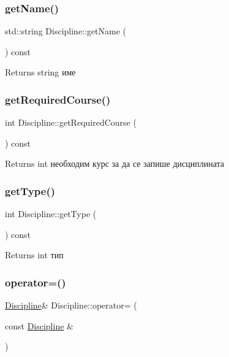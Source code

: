 \subsubsection{\texorpdfstring{get\+Name()}{getName()}}
{\footnotesize\ttfamily std\+::string Discipline\+::get\+Name (\begin{DoxyParamCaption}{ }\end{DoxyParamCaption}) const}

\begin{DoxyReturn}{Returns}
string име 
\end{DoxyReturn}
\mbox{\label{class_discipline_a4218ae936c5cc7615c631d425b0236a1}} 
\subsubsection{\texorpdfstring{get\+Required\+Course()}{getRequiredCourse()}}
{\footnotesize\ttfamily int Discipline\+::get\+Required\+Course (\begin{DoxyParamCaption}{ }\end{DoxyParamCaption}) const}

\begin{DoxyReturn}{Returns}
int необходим курс за да се запише дисциплината 
\end{DoxyReturn}
\mbox{\label{class_discipline_a54a87ad8c274c6ea4583b9d459416123}} 
\subsubsection{\texorpdfstring{get\+Type()}{getType()}}
{\footnotesize\ttfamily int Discipline\+::get\+Type (\begin{DoxyParamCaption}{ }\end{DoxyParamCaption}) const}

\begin{DoxyReturn}{Returns}
int тип 
\end{DoxyReturn}
\mbox{\label{class_discipline_a7dfde4e359542c96d51abdfd3b82b1d5}} 
\subsubsection{\texorpdfstring{operator=()}{operator=()}}
{\footnotesize\ttfamily \hyperlink{class_discipline}{Discipline}\& Discipline\+::operator= (\begin{DoxyParamCaption}\item[{const \hyperlink{class_discipline}{Discipline} \&}]{ }\end{DoxyParamCaption})}



